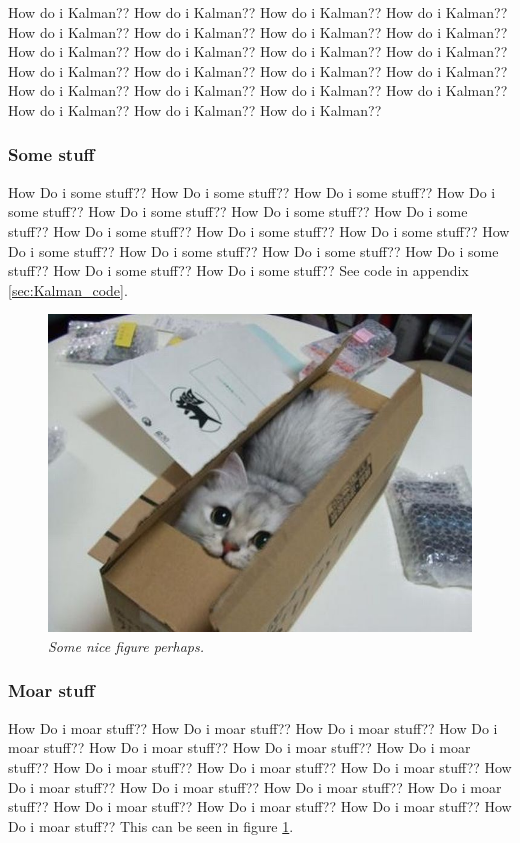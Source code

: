 How do i Kalman?? How do i Kalman?? How do i Kalman?? How do i Kalman?? How do i Kalman?? How do i Kalman?? How do i Kalman?? How do i Kalman?? How do i Kalman?? How do i Kalman?? How do i Kalman?? How do i Kalman?? How do i Kalman?? How do i Kalman?? How do i Kalman?? How do i Kalman?? How do i Kalman?? How do i Kalman?? How do i Kalman?? How do i Kalman?? How do i Kalman?? How do i Kalman?? How do i Kalman?? 

\subsubsection{Some stuff}
How Do i some stuff?? How Do i some stuff?? How Do i some stuff?? How Do i some stuff?? How Do i some stuff?? How Do i some stuff?? How Do i some stuff?? How Do i some stuff?? How Do i some stuff?? How Do i some stuff?? How Do i some stuff?? How Do i some stuff?? How Do i some stuff?? How Do i some stuff?? How Do i some stuff?? How Do i some stuff?? 
See code in appendix \ref{sec:Kalman_code}. %

\begin{figure}[htb]
	\centering
	\includegraphics[width=\linewidth]{images/acatisfinetoo}
	\caption{\textit{Some nice figure perhaps.}}
	\label{fig:kalman_fig} %
\end{figure}

\subsubsection{Moar stuff}
How Do i moar stuff?? How Do i moar stuff?? How Do i moar stuff?? How Do i moar stuff?? How Do i moar stuff?? How Do i moar stuff?? How Do i moar stuff?? How Do i moar stuff?? How Do i moar stuff?? How Do i moar stuff?? How Do i moar stuff?? How Do i moar stuff?? How Do i moar stuff?? How Do i moar stuff?? How Do i moar stuff?? How Do i moar stuff?? How Do i moar stuff?? How Do i moar stuff??  
This can be seen in figure \ref{fig:kalman_fig}. %